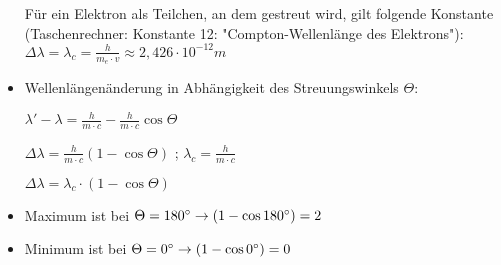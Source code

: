 \begin{itemize}
\begin{comment}
$\frac{h}{\Delta \lambda} = m \cdot v$ \\

Dann noch nach $\Delta \lambda$ umformen und man erhält die Compton Wellenlänge: \\
$\Delta \lambda = \lambda_c = \frac{h}{m \cdot v}$ \\
\end{comment}

Für ein Elektron als Teilchen, an dem gestreut wird, gilt folgende Konstante (Taschenrechner: Konstante 12: "Compton-Wellenlänge des Elektrons"): \\
$\Delta \lambda = \lambda_c = \frac{h}{m_e \cdot v} \approx 2,426 \cdot 10^{-12}m $ \\


\item Wellenlängenänderung in Abhängigkeit des Streuungswinkels $\Theta$:

$\lambda' -\lambda = \frac{h}{m \cdot c}-\frac{h}{m \cdot c} \cos{\Theta}$

$\Delta\lambda = \frac{h}{m \cdot c}(1-\cos{\Theta})$  ; $\lambda_c = \frac{h}{m \cdot c}$

$\Delta\lambda = \lambda_c \cdot (1-\cos{\Theta})$

\item Maximum ist bei $\Theta = 180\degree \rightarrow (1-\cos{180\degree})=2$
\item Minimum ist bei $\Theta = 0\degree \rightarrow (1-\cos{0\degree})=0$

\end{itemize}